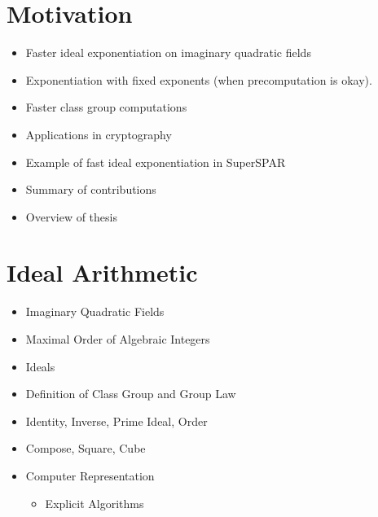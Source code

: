 \documentclass[11pt, letterpaper]{article}
\theoremstyle{definition}
\begin{document}
\section{Motivation}
\begin{itemize}
\item Faster ideal exponentiation on imaginary quadratic fields
\item Exponentiation with fixed exponents (when precomputation is okay).
\item Faster class group computations
\item Applications in cryptography
\item Example of fast ideal exponentiation in SuperSPAR
\item Summary of contributions
\item Overview of thesis
\end{itemize}


\bigbreak
\section{Ideal Arithmetic}
\begin{itemize}
\item Imaginary Quadratic Fields
\item Maximal Order of Algebraic Integers
\item Ideals
\item Definition of Class Group and Group Law
\item Identity, Inverse, Prime Ideal, Order
\item Compose, Square, Cube
\item Computer Representation
	\begin{itemize}
	\item Explicit Algorithms
	\end{itemize}
\end{itemize}

\bigbreak
\end{document}
